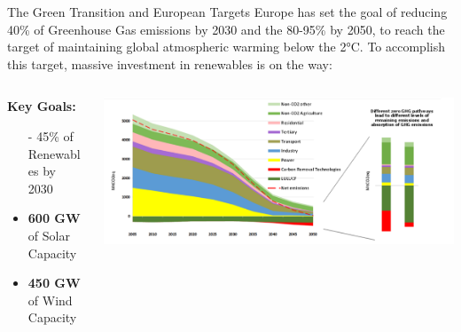 \documentclass[aspectratio=169,hyperref={pdfpagelabels=false}]{beamer}
\begin{document}
    \begin{frame}{\Large{The Green Transition and European Targets}}
    Europe has set the goal of reducing 40\% of Greenhouse Gas emissions by 2030 and the 80-95\% by 2050, to reach the target of maintaining global atmospheric warming below the 2°\;C. 
    To accomplish this target, massive investment in renewables is on the way:

    \vspace*{1em}

        \begin{columns}
          \begin{column}{0.4\textwidth}
            \textbf{Key Goals: }
            \begin{itemize}
                \item[-] 45\% of Renewables by 2030
            \end{itemize}
            \begin{itemize}
                \item \textbf{600 GW} of Solar Capacity
                \item \textbf{450 GW} of Wind Capacity
            \end{itemize}
            
          \end{column}
      
          \begin{column}{0.7\textwidth}
            \includegraphics[width=\textwidth]{img/pic1.png} %
          \end{column}
        \end{columns}
        \let\thefootnote\relax{}
      \end{frame}
\end{document}
